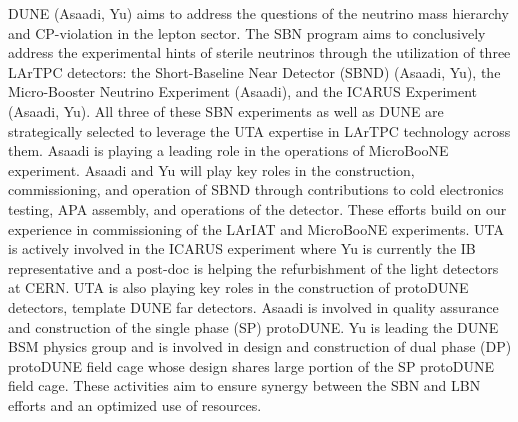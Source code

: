  
DUNE (Asaadi, Yu) aims to address the questions of the neutrino mass hierarchy and CP-violation in the lepton sector. The SBN program aims to conclusively address the experimental hints of sterile neutrinos through the utilization of three LArTPC detectors: the Short-Baseline Near Detector (SBND) (Asaadi, Yu), the Micro-Booster Neutrino Experiment (Asaadi), and the ICARUS Experiment (Asaadi, Yu). All three of these SBN experiments as well as DUNE are strategically selected to leverage the UTA expertise in LArTPC technology across them.
Asaadi is playing a leading role in the operations of MicroBooNE experiment. Asaadi and Yu will play key roles in the construction, commissioning, and operation of SBND through contributions to cold electronics testing, APA assembly, and operations of the detector. These efforts build on our experience in commissioning of the LArIAT and MicroBooNE experiments. UTA is actively involved in the ICARUS experiment where Yu is currently the IB representative and a post-doc is helping the refurbishment of the light detectors at CERN.  UTA is also playing key roles in the construction of protoDUNE detectors, template DUNE far detectors. Asaadi is involved in quality assurance and construction of the single phase (SP) protoDUNE. Yu is leading the DUNE BSM physics group and is involved in design and construction of dual phase (DP) protoDUNE field cage whose design shares large portion of the SP protoDUNE field cage. These activities aim to ensure synergy between the SBN and LBN efforts and an optimized use of resources.

